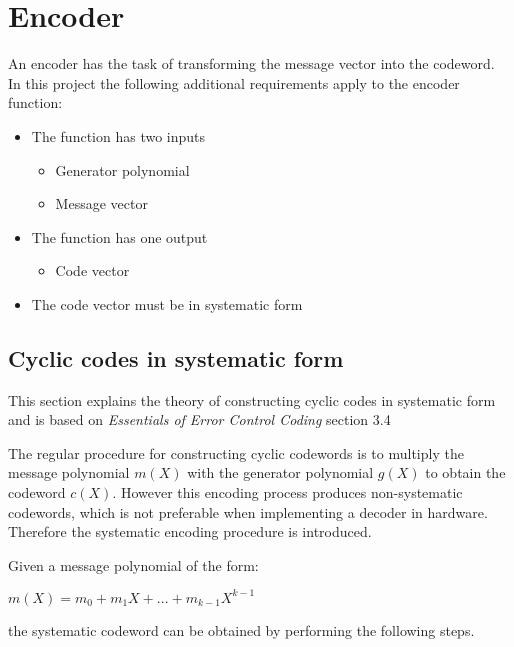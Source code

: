 \documentclass[Main]{subfiles}
\begin{document}
\chapter{Encoder}
An encoder has the task of transforming the message vector into the codeword. In this project the following additional requirements apply to the encoder function:

\begin{itemize}
\item The function has two inputs
	\begin{itemize}
	\item Generator polynomial
	\item Message vector
	\end{itemize}
\item The function has one output
	\begin{itemize}
	\item Code vector
	\end{itemize}
\item The code vector must be in systematic form
\end{itemize} 

\section{Cyclic codes in systematic form}
This section explains the theory of constructing cyclic codes in systematic form and is based on \emph{Essentials of Error Control Coding}\cite{essentials} section 3.4

The regular procedure for constructing cyclic codewords is to multiply the message polynomial $m(X)$ with the generator polynomial $g(X)$ to obtain the codeword $c(X)$. However this encoding process produces non-systematic codewords, which is not preferable when implementing a decoder in hardware. Therefore the systematic encoding procedure is introduced.

Given a message polynomial of the form:

{\centering 
$m(X) = m_0 + m_1X + ... + m_{k-1}X^{k-1}$ \par}

the systematic codeword can be obtained by performing the following steps.
\end{document}
